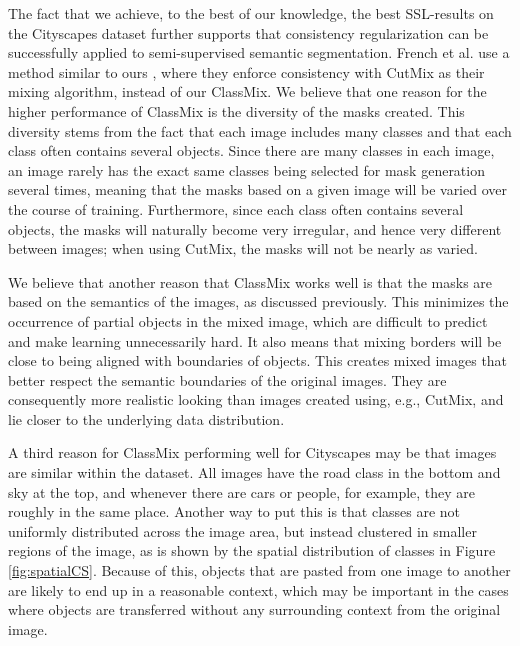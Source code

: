 \documentclass[10pt,twocolumn,letterpaper]{article}
\begin{document}
The fact that we achieve, to the best of our knowledge, the best SSL-results on the Cityscapes dataset further supports that consistency regularization can be successfully applied to semi-supervised semantic segmentation. French et al. use a method similar to ours \cite{French}, where they enforce consistency with CutMix as their mixing algorithm, instead of our ClassMix. We believe that one reason for the higher performance of ClassMix is the diversity of the masks created. This diversity stems from the fact that each image includes many classes and that each class often contains several objects. Since there are many classes in each image, an image rarely has the exact same classes being selected for mask generation several times, meaning that the masks based on a given image will be varied over the course of training. Furthermore, since each class often contains several objects, the masks will naturally become very irregular, and hence very different between images; when using CutMix, the masks will not be nearly as varied.

We believe that another reason that ClassMix works well is that the masks are based on the semantics of the images, as discussed previously. This minimizes the occurrence of partial objects in the mixed image, which are difficult to predict and make learning unnecessarily hard. It also means that mixing borders will be close to being aligned with boundaries of objects. This creates mixed images that better respect the semantic boundaries of the original images. They are consequently more realistic looking than images created using, e.g., CutMix, and lie closer to the underlying data distribution.

A third reason for ClassMix performing well for Cityscapes may be that images are similar within the dataset. All images have the road class in the bottom and sky at the top, and whenever there are cars or people, for example, they are roughly in the same place. Another way to put this is that classes are not uniformly distributed across the image area, but instead clustered in smaller regions of the image, as is shown by the spatial distribution of classes in Figure \ref{fig:spatialCS}.
Because of this, objects that are pasted from one image to another are likely to end up in a reasonable context, which may be important in the cases where objects are transferred without any surrounding context from the original image.

\end{document}
